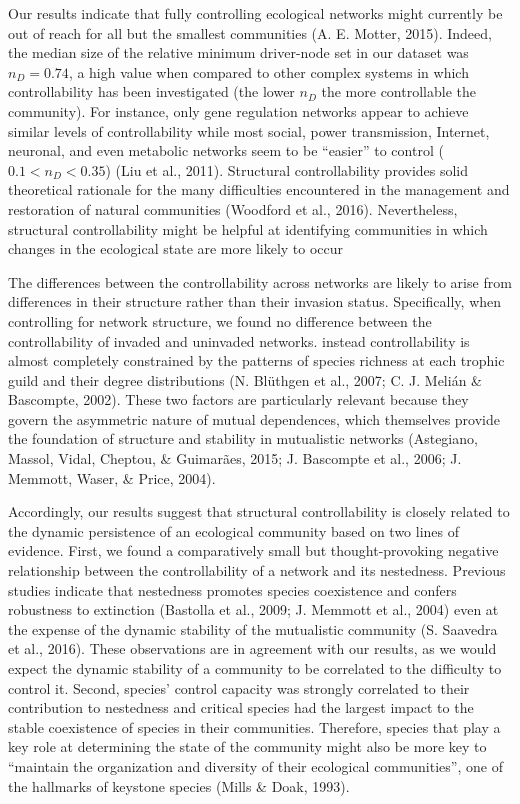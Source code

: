 \documentclass[a4paper]{artikel1}
\theoremstyle{definition}
\theoremstyle{definition}
\theoremstyle{definition}
\theoremstyle{remark}
\begin{document}
Our results indicate that fully controlling ecological networks might
currently be out of reach for all but the smallest communities (A. E.
Motter, 2015). Indeed, the median size of the relative minimum
driver-node set in our dataset was \(n_D = 0.74\), a high value when
compared to other complex systems in which controllability has been
investigated (the lower \(n_D\) the more controllable the community).
For instance, only gene regulation networks appear to achieve similar
levels of controllability while most social, power transmission,
Internet, neuronal, and even metabolic networks seem to be ``easier'' to
control (\(0.1 < n_D < 0.35\)) (Liu et al., 2011). Structural
controllability provides solid theoretical rationale for the many
difficulties encountered in the management and restoration of natural
communities (Woodford et al., 2016). Nevertheless, structural
controllability might be helpful at identifying communities in which
changes in the ecological state are more likely to occur

The differences between the controllability across networks are likely
to arise from differences in their structure rather than their invasion
status. Specifically, when controlling for network structure, we found
no difference between the controllability of invaded and uninvaded
networks. instead controllability is almost completely constrained by
the patterns of species richness at each trophic guild and their degree
distributions (N. Blüthgen et al., 2007; C. J. Melián \& Bascompte,
2002). These two factors are particularly relevant because they govern
the asymmetric nature of mutual dependences, which themselves provide
the foundation of structure and stability in mutualistic networks
(Astegiano, Massol, Vidal, Cheptou, \& Guimarães, 2015; J. Bascompte et
al., 2006; J. Memmott, Waser, \& Price, 2004).

Accordingly, our results suggest that structural controllability is
closely related to the dynamic persistence of an ecological community
based on two lines of evidence. First, we found a comparatively small
but thought-provoking negative relationship between the controllability
of a network and its nestedness. Previous studies indicate that
nestedness promotes species coexistence and confers robustness to
extinction (Bastolla et al., 2009; J. Memmott et al., 2004) even at the
expense of the dynamic stability of the mutualistic community (S.
Saavedra et al., 2016). These observations are in agreement with our
results, as we would expect the dynamic stability of a community to be
correlated to the difficulty to control it. Second, species' control
capacity was strongly correlated to their contribution to nestedness and
critical species had the largest impact to the stable coexistence of
species in their communities. Therefore, species that play a key role at
determining the state of the community might also be more key to
``maintain the organization and diversity of their ecological
communities'', one of the hallmarks of keystone species (Mills \& Doak,
1993).
\end{document}
